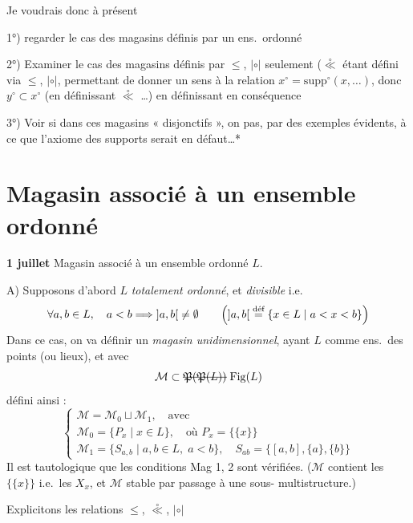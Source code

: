 \documentclass[11pt,a4paper]{article}
\begin{document}
Je voudrais donc à présent

1°) regarder le cas des magasins  définis par un ens.\ ordonné

2°) Examiner le cas des magasins définis par $\le$, $|{\circ}|$ seulement ($\overset{\circ}{\ll}$ étant défini via $\le$, $|{\circ}|$, \struck{\ill{}}  permettant de donner un sens à la relation $x^\circ = \mathrm{supp}^\circ(x,\ldots)$, donc $y^\circ \subset x^\circ$ (en définissant $\overset{\circ}{\ll}$ …) en définissant en conséquence

3°) Voir si dans ces magasins « disjonctifs », on  pas, par des exemples évidents, à ce que l'axiome des supports serait en défaut…*

\section{Magasin associé à un ensemble ordonné}


\textbf{1 juillet} Magasin associé à un ensemble ordonné $L$.

A) \struck{\ill{}} Supposons d'abord $L$ \textit{totalement ordonné}, et \textit{divisible} i.e.
\[
\forall a,b\in L, \quad a<b \Longrightarrow \;]a,b[\; \neq \emptyset
\qquad \Bigl(]a,b[ \;\overset{\text{déf}}{=} \{x\in L \mid a<x<b\}\Bigr)
\]
Dans ce cas, on va définir un \textit{magasin unidimensionnel}, ayant $L$ comme ens.\ des points (ou lieux), et avec
\[
\mathcal{M} \subset \text{\struck{$\mathfrak{P}(\mathfrak{P}(L))$}}\; \mathrm{Fig}(L)
\]
défini ainsi :
\[
\begin{cases}
\mathcal{M} = \mathcal{M}_0 \sqcup \mathcal{M}_1, \quad \text{avec}\\
\mathcal{M}_0 = \{P_x \mid x \in L\}, \quad \text{où } P_x = \{\{x\}\}\\
\mathcal{M}_1 = \{S_{a,b} \mid a,b\in L,\; a<b\}, \quad S_{ab} = \{[a,b],\{a\},\{b\}\}
\end{cases}
\]
Il est tautologique que les conditions Mag 1, 2 sont vérifiées. ($\mathcal{M}$ contient les $\{\{x\}\}$ i.e.\ les $X_x$, et $\mathcal{M}$ stable par passage à une sous- multistructure.)

Explicitons les relations $\le$, $\overset{\circ}{\ll}$, $|{\circ}|$
\end{document}
